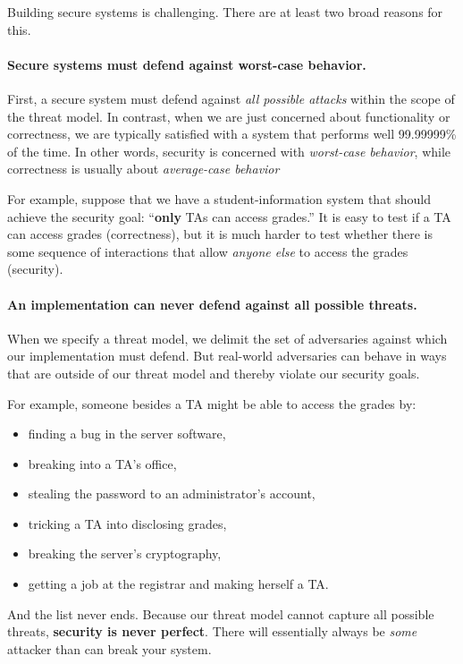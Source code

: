 Building secure systems is challenging.
There are at least two broad reasons for this.

\paragraph{Secure systems must defend against worst-case behavior.}
First, a secure system must defend against
\emph{all possible attacks} within the scope of 
the threat model.
In contrast, when we are just concerned about functionality or
correctness, we are typically satisfied with a system 
that performs well 99.99999\% of the time.
In other words, security is concerned with \emph{worst-case behavior},
while correctness is usually about \emph{average-case behavior}

For example, suppose that we have
a student-information system that should achieve the security
goal: ``\textbf{only} TAs can access grades.''
It is easy to test if a TA can
access grades (correctness), but it is much harder to test whether
there is some sequence of interactions that allow
\textit{anyone else} to access the grades (security).

\paragraph{An implementation can never defend against all possible threats.}
When we specify a threat model, we delimit the set of adversaries 
against which our implementation must defend.
But real-world adversaries can behave in ways that are 
outside of our threat model and thereby violate our security goals.

For example, someone besides a TA might be able to
access the grades by:
\begin{itemize}
	\item finding a bug in the server software,
	\item breaking into a TA's office,
	\item stealing the password to an administrator's account,
	\item tricking a TA into disclosing grades,
	\item breaking the server's cryptography,
	\item getting a job at the registrar and making herself a TA.
\end{itemize}

And the list never ends. Because our threat model cannot capture all
possible threats, \textbf{security is never perfect}.
There will essentially always be \textit{some} attacker than can break your system.

